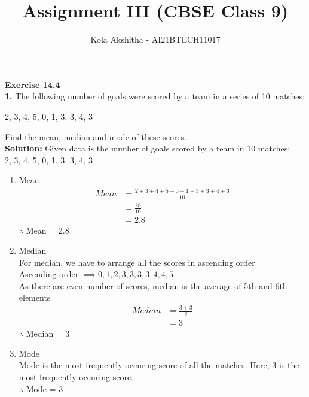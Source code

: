 \documentclass[journal,12pt,twocolumn]{IEEEtran}
\title{Assignment III (CBSE Class 9)}
\author{Kola Akshitha - AI21BTECH11017}
\begin{document}
\maketitle 
\textbf{Exercise 14.4} \\
\textbf{1.}
The following number of goals were scored by a team in a series of 10 matches: 
\begin{center}
2, 3, 4, 5, 0, 1, 3, 3, 4, 3  
\end{center}
Find the mean, median and mode of these scores. \\

\textbf{Solution:}
Given data is the number of goals scored by a team in 10 matches: \\
2, 3, 4, 5, 0, 1, 3, 3, 4, 3  
\begin{enumerate}[label=(\roman{enumi})]

\item Mean \\
\begin{align}
Mean &= \frac{2+3+4+5+0+1+3+3+4+3}{10} \nonumber\\
&= \frac{28}{10} \nonumber\\
&= 2.8 \nonumber
\end{align}
$\therefore$ Mean = 2.8 \\

\item Median \\
For median, we have to arrange all the scores in ascending order \\
Ascending order $\implies 0, 1, 2, 3, 3, 3, 3, 4, 4, 5$ \\
As there are even number of scores, median is the average of 5th and 6th elements \\
\begin{align}
Median &= \frac{3+3}{2} \nonumber\\
&= 3 \nonumber
\end{align}
$\therefore$ Median = 3 \\

\item Mode \\
Mode is the most frequently occuring score of all the matches.
Here, 3 is the most frequently occuring score. \\
$\therefore$ Mode = 3

\end{enumerate}
\end{document}
